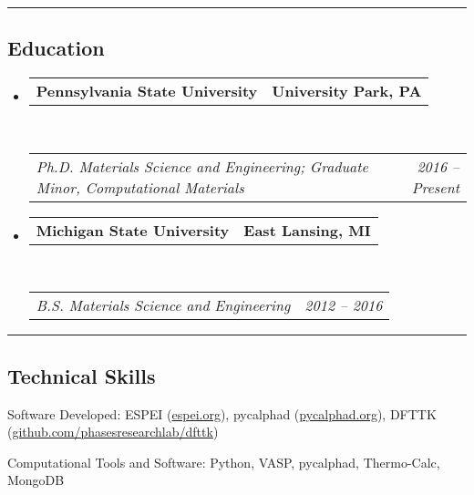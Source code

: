 \documentclass[10pt,letterpaper]{article}
\makeatletter
\newenvironment{indentsection}[1]%
{\begin{list}{}%
  {\setlength{\leftmargin}{#1}}%
  \item[]%
}
{\end{list}}
\newcommand{\headerrow}[2]
{\begin{tabular*}{\linewidth}{l@{\extracolsep{\fill}}r}
  #1 &
  #2 \\
\end{tabular*}}
\makeatother
\begin{document}
\hrule
\vspace{-0.6em}
\subsection*{Education}

\begin{itemize}
  \parskip=0.1em

  \item
  \headerrow
    {\textbf{Pennsylvania State University}}
    {\textbf{University Park, PA}}
  \\
  \headerrow
    {\emph{Ph.D. Materials Science and Engineering; Graduate Minor, Computational Materials}}
    {\emph{2016 -- Present}}


  \item
  \headerrow
    {\textbf{Michigan State University}}
    {\textbf{East Lansing, MI}}
  \\
  \headerrow
    {\emph{B.S. Materials Science and Engineering}}
    {\emph{2012 -- 2016}}

\end{itemize}

\hrule
\vspace{-0.6em}
\subsection*{Technical Skills}

\begin{indentsection}{\parindent}
\begin{description*}
  \item [Software Developed:]
  ESPEI (\href{https://espei.org}{espei.org}), pycalphad (\href{https://pycalphad.org}{pycalphad.org}), DFTTK (\href{https://github.com/PhasesResearchLab/DFTTK}{github.com/phasesresearchlab/dfttk})
  \item[Computational Tools and Software:]
  Python, VASP, pycalphad, Thermo-Calc, MongoDB
\end{description*}
\end{indentsection}
\end{document}
